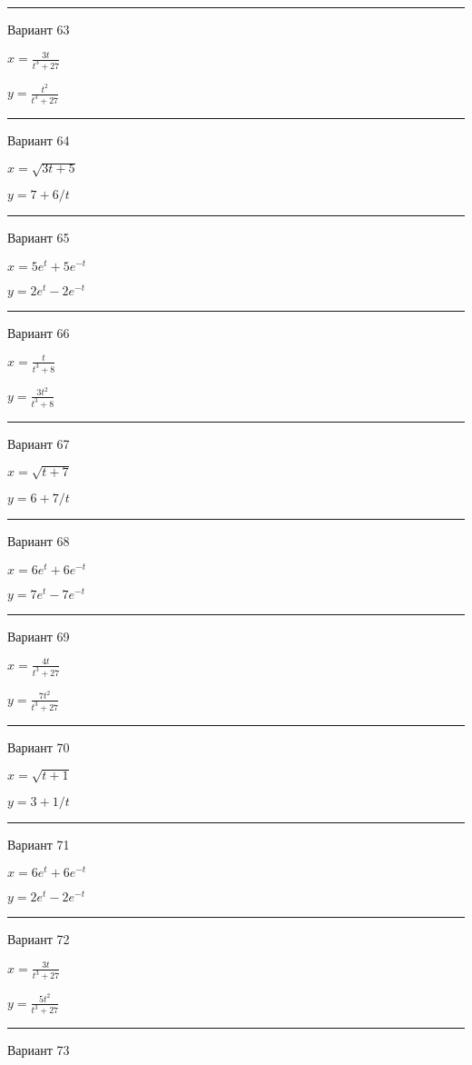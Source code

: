 \documentclass[11pt]{report}
\begin{document}
\rule{\textwidth}{.2mm}

 Вариант 63

$x = \frac{3 t}{t^{3} + 27}$

$y = \frac{t^{2}}{t^{3} + 27}$

\rule{\textwidth}{.2mm}

 Вариант 64

$x = \sqrt{3 t + 5}$

$y = 7 + 6 / t$

\rule{\textwidth}{.2mm}

 Вариант 65

$x = 5 e^{t} + 5 e^{- t}$

$y = 2 e^{t} - 2 e^{- t}$

\rule{\textwidth}{.2mm}

 Вариант 66

$x = \frac{t}{t^{3} + 8}$

$y = \frac{3 t^{2}}{t^{3} + 8}$

\rule{\textwidth}{.2mm}

 Вариант 67

$x = \sqrt{t + 7}$

$y = 6 + 7 / t$

\rule{\textwidth}{.2mm}

 Вариант 68

$x = 6 e^{t} + 6 e^{- t}$

$y = 7 e^{t} - 7 e^{- t}$

\rule{\textwidth}{.2mm}

 Вариант 69

$x = \frac{4 t}{t^{3} + 27}$

$y = \frac{7 t^{2}}{t^{3} + 27}$

\rule{\textwidth}{.2mm}

 Вариант 70

$x = \sqrt{t + 1}$

$y = 3 + 1 / t$

\rule{\textwidth}{.2mm}

 Вариант 71

$x = 6 e^{t} + 6 e^{- t}$

$y = 2 e^{t} - 2 e^{- t}$

\rule{\textwidth}{.2mm}

 Вариант 72

$x = \frac{3 t}{t^{3} + 27}$

$y = \frac{5 t^{2}}{t^{3} + 27}$

\rule{\textwidth}{.2mm}

 Вариант 73
\end{document}
